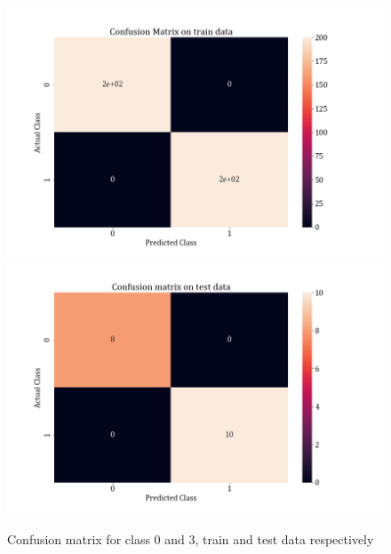 \documentclass[11pt,a4paper]{article}
\begin{document}
\begin{figure}[H]
\centering
\includegraphics[scale=0.4]{images/1A_ovo_conf03_train.png}
\includegraphics[scale=0.4]{images/1A_ovo_conf03_test.png}
\caption{Confusion matrix for class 0 and 3, train and test data respectively}
\end{figure}
\end{document}
